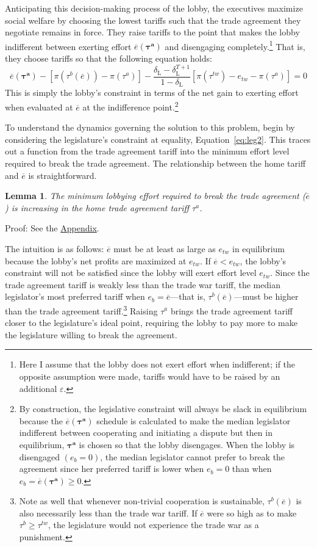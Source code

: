 \documentclass[authoryear, review]{elsarticle}
\newtheorem{lemma}{Lemma}
\newcommand{\ov}{\overline}
\newcommand{\bta}{\bm{\tau^a}}
\newcommand{\de}{\delta}
\begin{document}
Anticipating this decision-making process of the lobby, the executives maximize social welfare by choosing the lowest tariffs such that the trade agreement they negotiate remains in force. They raise tariffs to the point that makes the lobby indifferent between exerting effort $\ov{e}(\bta)$ and disengaging completely.\footnote{Here I assume that the lobby does not exert effort when indifferent; if the opposite assumption were made, tariffs would have to be raised by an additional $\varepsilon$.} That is, they choose tariffs so that the following equation holds:
\begin{equation}
  \ov{e}(\bta) - \left[ \pi(\tau^b(\ov{e})) - \pi(\tau^a) \right] - \frac{\de_\text{L} - \de_\text{L}^{T+1}}{1-\de_\text{L}} \left[\pi(\tau^{tw}) -e_{tw} - \pi(\tau^a) \right] = 0
  \label{eq:lob2}
\end{equation}
This is simply the lobby's constraint in terms of the net gain to exerting effort when evaluated at $\ov{e}$ at the indifference point.\footnote{By construction, the legislative constraint will always be slack in equilibrium because the $\ov{e}(\bta)$ schedule is calculated to make the median legislator indifferent between cooperating and initiating a dispute but then in equilibrium, $\bta$ is chosen so that the lobby disengages. When the lobby is disengaged $\left(e_b=0\right)$, the median legislator cannot prefer to break the agreement since her preferred tariff is lower when $e_b=0$ than when $e_b=\ov{e}(\bta) \geq 0$.}

To understand the dynamics governing the solution to this problem, begin by considering the legislature's constraint at equality, Equation~\ref{eq:leg2}. This traces out a function from the trade agreement tariff into the minimum effort level required to break the trade agreement. The relationship between the home tariff and $\ov{e}$ is straightforward. 
\begin{lemma}
  The minimum lobbying effort required to break the trade agreement ($\ov{e}$) is increasing in the home trade agreement tariff $\tau^a$.
  \label{lem:et}
\end{lemma}
Proof: See the \hyperlink{Cor_et}{Appendix}.

\noindent The intuition is as follows: $\ov{e}$ must be at least as large as $e_{tw}$ in equilibrium because the lobby's net profits are maximized at $e_{tw}$. If $\ov{e} < e_{tw}$, the lobby's constraint will not be satisfied since the lobby will exert effort level $e_{tw}$. Since the trade agreement tariff is weakly less than the trade war tariff, the median legislator's most preferred tariff when $e_b=\ov{e}$---that is, $\tau^b\left(\ov{e}\right)$---must be higher than the trade agreement tariff.\footnote{Note as well that whenever non-trivial cooperation is sustainable, $\tau^b\left(\ov{e}\right)$ is also necessarily less than the trade war tariff. If $\ov{e}$ were so high as to make $\tau^b \geq \tau^{tw}$, the legislature would not experience the trade war as a punishment.} Raising $\tau^a$ brings the trade agreement tariff closer to the legislature's ideal point, requiring the lobby to pay more to make the legislature willing to break the agreement.
\end{document}
